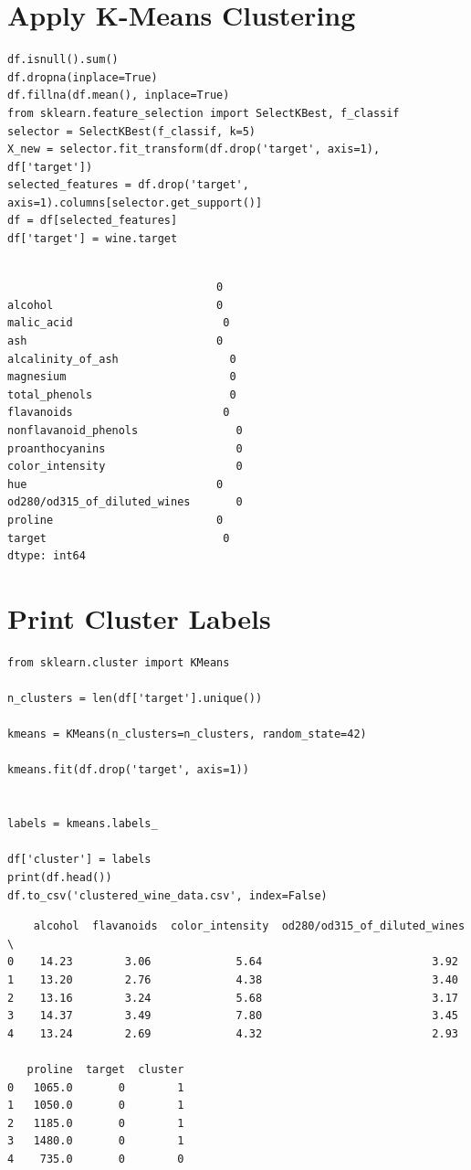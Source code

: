 \section{Apply K-Means Clustering}
\vspace{-.6cm}
\begin{code}
\begin{lstlisting}
df.isnull().sum()
df.dropna(inplace=True)
df.fillna(df.mean(), inplace=True)
from sklearn.feature_selection import SelectKBest, f_classif
selector = SelectKBest(f_classif, k=5)
X_new = selector.fit_transform(df.drop('target', axis=1), df['target'])
selected_features = df.drop('target', axis=1).columns[selector.get_support()]
df = df[selected_features]
df['target'] = wine.target
\end{lstlisting}
\end{code}
\vspace{-1cm}
\begin{verbatim}
 
                                0
alcohol	                        0
malic_acid	                     0
ash	                            0
alcalinity_of_ash	              0
magnesium	                      0
total_phenols	                  0
flavanoids	                     0
nonflavanoid_phenols        	   0
proanthocyanins             	   0
color_intensity             	   0
hue	                            0
od280/od315_of_diluted_wines	   0
proline	                        0
target	                         0
dtype: int64
\end{verbatim}
\section{ Print Cluster Labels}
\begin{lstlisting}
from sklearn.cluster import KMeans

n_clusters = len(df['target'].unique())

kmeans = KMeans(n_clusters=n_clusters, random_state=42)

kmeans.fit(df.drop('target', axis=1))


labels = kmeans.labels_

df['cluster'] = labels
print(df.head())
df.to_csv('clustered_wine_data.csv', index=False)
\end{lstlisting}
\begin{verbatim}
    alcohol  flavanoids  color_intensity  od280/od315_of_diluted_wines  \
0    14.23        3.06             5.64                          3.92   
1    13.20        2.76             4.38                          3.40   
2    13.16        3.24             5.68                          3.17   
3    14.37        3.49             7.80                          3.45   
4    13.24        2.69             4.32                          2.93   

   proline  target  cluster  
0   1065.0       0        1  
1   1050.0       0        1  
2   1185.0       0        1  
3   1480.0       0        1  
4    735.0       0        0  
\end{verbatim}
